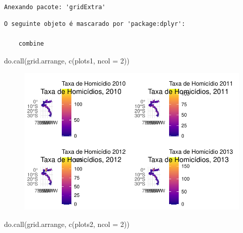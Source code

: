 \documentclass[
  letterpaper,
  DIV=11,
  numbers=noendperiod]{scrartcl}
\newenvironment{Shaded}{\begin{snugshade}}{\end{snugshade}}
\newcommand{\AttributeTok}[1]{\textcolor[rgb]{0.40,0.45,0.13}{#1}}
\newcommand{\DecValTok}[1]{\textcolor[rgb]{0.68,0.00,0.00}{#1}}
\newcommand{\FunctionTok}[1]{\textcolor[rgb]{0.28,0.35,0.67}{#1}}
\newcommand{\NormalTok}[1]{\textcolor[rgb]{0.00,0.23,0.31}{#1}}
\begin{document}
\begin{verbatim}

Anexando pacote: 'gridExtra'
\end{verbatim}

\begin{verbatim}
O seguinte objeto é mascarado por 'package:dplyr':

    combine
\end{verbatim}

\begin{Shaded}
\begin{Highlighting}[]
\FunctionTok{do.call}\NormalTok{(grid.arrange, }\FunctionTok{c}\NormalTok{(plots1, }\AttributeTok{ncol =} \DecValTok{2}\NormalTok{))}
\end{Highlighting}
\end{Shaded}

\begin{figure}[H]

{\centering \includegraphics{maps_files/figure-pdf/unnamed-chunk-24-1.pdf}

}

\end{figure}

\begin{Shaded}
\begin{Highlighting}[]
\FunctionTok{do.call}\NormalTok{(grid.arrange, }\FunctionTok{c}\NormalTok{(plots2, }\AttributeTok{ncol =} \DecValTok{2}\NormalTok{))}
\end{Highlighting}
\end{Shaded}
\end{document}
